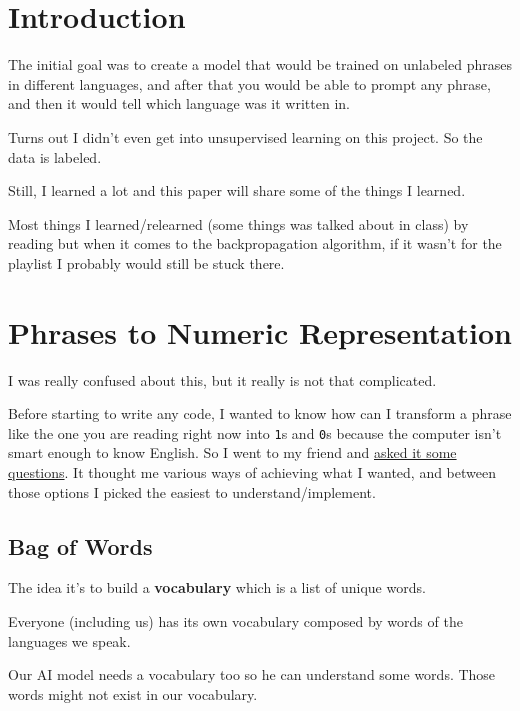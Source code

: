 \documentclass[a4paper,12pt]{article}
\theoremstyle{mytheoremstyle}
\theoremstyle{mytheoremstyle}
\theoremstyle{myproblemstyle}
\begin{document}

    \listoffigures

    \section{Introduction}

    The initial goal was to create a model that would be trained on unlabeled
    phrases in different languages, and after that you would be able to prompt
    any phrase, and then it would tell which language was it written in.

    Turns out I didn't even get into unsupervised learning on this project. So
    the data is labeled.

    Still, I learned a lot and this paper will share some of the things I
    learned.

    Most things I learned/relearned (some things was talked about in class) by
    reading \cite{bishop} but when it comes to the backpropagation algorithm,
    if it wasn't for the playlist \cite{3b1b} I probably would still be stuck
    there.

    \section{Phrases to Numeric Representation}

    I was really confused about this, but it really is not that complicated.

    Before starting to write any code, I wanted to know how can I transform a
    phrase like the one you are reading right now into \texttt{1}s and
    \texttt{0}s because the computer isn't smart enough to know English.
    So I went to my friend and
    \href{https://chatgpt.com/share/675976d6-b2c8-8002-964c-a3fff698bcc0}{asked
    it some questions}.
    It thought me various ways of achieving what I wanted, and between those
    options I picked the easiest to understand/implement.

    \subsection{Bag of Words}

    The idea it's to build a \textbf{vocabulary} which is a list of unique
    words.

    Everyone (including us) has its own vocabulary composed by words of the
    languages we speak.

    Our AI model needs a vocabulary too so he can understand some words. Those
    words might not exist in our vocabulary.
\end{document}
